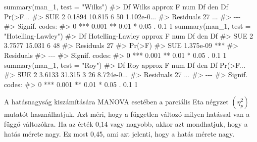 \documentclass[
  letterpaper,
]{krantz}
\makeatletter
\newenvironment{Shaded}{\begin{snugshade}}{\end{snugshade}}
\newcommand{\AttributeTok}[1]{\textcolor[rgb]{0.40,0.45,0.13}{#1}}
\newcommand{\CommentTok}[1]{\textcolor[rgb]{0.37,0.37,0.37}{#1}}
\newcommand{\FunctionTok}[1]{\textcolor[rgb]{0.28,0.35,0.67}{#1}}
\newcommand{\NormalTok}[1]{\textcolor[rgb]{0.00,0.23,0.31}{#1}}
\newcommand{\StringTok}[1]{\textcolor[rgb]{0.13,0.47,0.30}{#1}}
\newenvironment{kframe}{%
\medskip{}
\setlength{\fboxsep}{.8em}
 \def\at@end@of@kframe{}%
 \ifinner\ifhmode%
  \def\at@end@of@kframe{\end{minipage}}%
  \begin{minipage}{\columnwidth}%
 \fi\fi%
 \def\FrameCommand##1{\hskip\@totalleftmargin \hskip-\fboxsep
 \colorbox{shadecolor}{##1}\hskip-\fboxsep
     \hskip-\linewidth \hskip-\@totalleftmargin \hskip\columnwidth}%
 \MakeFramed {\advance\hsize-\width
   \@totalleftmargin\z@ \linewidth\hsize
   \@setminipage}}%
 {\par\unskip\endMakeFramed%
 \at@end@of@kframe}
\renewenvironment{Shaded}{\begin{kframe}}{\end{kframe}}
\makeatother
\begin{document}
\begin{Shaded}
\begin{Highlighting}[]
\FunctionTok{summary}\NormalTok{(man\_1, }\AttributeTok{test =} \StringTok{"Wilks"}\NormalTok{)}
\CommentTok{\#\textgreater{}           Df  Wilks approx F num Df den Df    Pr(\textgreater{}F...}
\CommentTok{\#\textgreater{} SUE        2 0.1894   10.815      6     50 1.102e{-}0...}
\CommentTok{\#\textgreater{} Residuals 27                                       ...}
\CommentTok{\#\textgreater{} {-}{-}{-}}
\CommentTok{\#\textgreater{} Signif. codes:  }
\CommentTok{\#\textgreater{} 0 \textquotesingle{}***\textquotesingle{} 0.001 \textquotesingle{}**\textquotesingle{} 0.01 \textquotesingle{}*\textquotesingle{} 0.05 \textquotesingle{}.\textquotesingle{} 0.1 \textquotesingle{} \textquotesingle{} 1}
\FunctionTok{summary}\NormalTok{(man\_1, }\AttributeTok{test =} \StringTok{"Hotelling{-}Lawley"}\NormalTok{)}
\CommentTok{\#\textgreater{}           Df Hotelling{-}Lawley approx F num Df den Df}
\CommentTok{\#\textgreater{} SUE        2           3.7577   15.031      6     48}
\CommentTok{\#\textgreater{} Residuals 27                                        }
\CommentTok{\#\textgreater{}              Pr(\textgreater{}F)    }
\CommentTok{\#\textgreater{} SUE       1.375e{-}09 ***}
\CommentTok{\#\textgreater{} Residuals              }
\CommentTok{\#\textgreater{} {-}{-}{-}}
\CommentTok{\#\textgreater{} Signif. codes:  }
\CommentTok{\#\textgreater{} 0 \textquotesingle{}***\textquotesingle{} 0.001 \textquotesingle{}**\textquotesingle{} 0.01 \textquotesingle{}*\textquotesingle{} 0.05 \textquotesingle{}.\textquotesingle{} 0.1 \textquotesingle{} \textquotesingle{} 1}
\FunctionTok{summary}\NormalTok{(man\_1, }\AttributeTok{test =} \StringTok{"Roy"}\NormalTok{)}
\CommentTok{\#\textgreater{}           Df    Roy approx F num Df den Df    Pr(\textgreater{}F...}
\CommentTok{\#\textgreater{} SUE        2 3.6133   31.315      3     26 8.724e{-}0...}
\CommentTok{\#\textgreater{} Residuals 27                                       ...}
\CommentTok{\#\textgreater{} {-}{-}{-}}
\CommentTok{\#\textgreater{} Signif. codes:  }
\CommentTok{\#\textgreater{} 0 \textquotesingle{}***\textquotesingle{} 0.001 \textquotesingle{}**\textquotesingle{} 0.01 \textquotesingle{}*\textquotesingle{} 0.05 \textquotesingle{}.\textquotesingle{} 0.1 \textquotesingle{} \textquotesingle{} 1}
\end{Highlighting}
\end{Shaded}

A hatásnagyság kiszámítására MANOVA esetében a parciális Eta négyzet
\((\eta_p^2)\) mutatót használhatjuk. Azt méri, hogy a független változó
milyen hatással van a függő változókra. Ha az érték 0,14 vagy nagyobb,
akkor azt mondhatjuk, hogy a hatás mérete nagy. Ez most 0,45, ami azt
jelenti, hogy a hatás mérete nagy.
\end{document}
